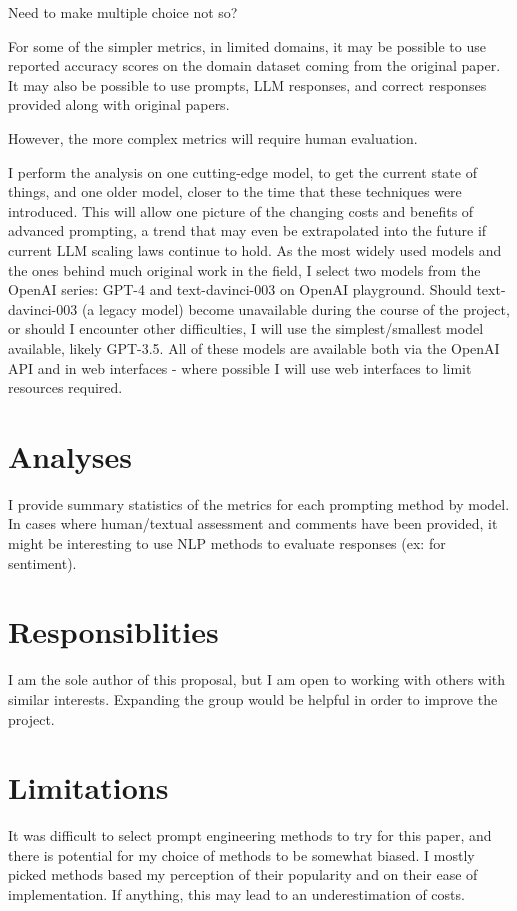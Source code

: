 \documentclass[11pt]{article}
\begin{document}
Need to make multiple choice not so?

For some of the simpler metrics, in limited domains, it may be possible to use reported accuracy scores on the domain dataset coming from the original paper. It may also be possible to use prompts, LLM responses, and correct responses provided along with original papers. 

However, the more complex metrics will require human evaluation.

I perform the analysis on one cutting-edge model, to get the current state of things, and one older model, closer to the time that these techniques were introduced. This will allow one picture of the changing costs and benefits of advanced prompting, a trend that may even be extrapolated into the future if current LLM scaling laws continue to hold. As the most widely used models and the ones behind much original work in the field, I select two models from the OpenAI series: GPT-4 and text-davinci-003 on OpenAI playground. Should text-davinci-003 (a legacy model) become unavailable during the course of the project, or should I encounter other difficulties, I will use the simplest/smallest model available, likely GPT-3.5. All of these models are available both via the OpenAI API and in web interfaces - where possible I will use web interfaces to limit resources required.

\section*{Analyses}

I provide summary statistics of the metrics for each prompting method by model. In cases where human/textual assessment and comments have been provided, it might be interesting to use NLP methods to evaluate responses (ex: for sentiment).

\section*{Responsiblities}

I am the sole author of this proposal, but I am open to working with others with similar interests. Expanding the group would be helpful in order to improve the project.

\section*{Limitations}

It was difficult to select prompt engineering methods to try for this paper, and there is potential for my choice of methods to be somewhat biased. I mostly picked methods based my perception of their popularity and on their ease of implementation. If anything, this may lead to an underestimation of costs.
\end{document}
